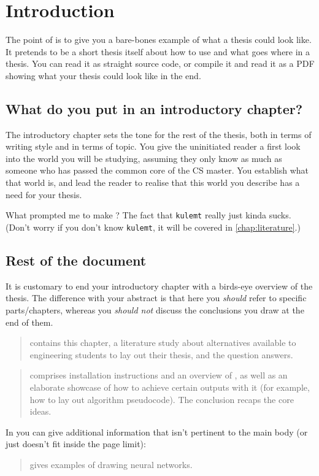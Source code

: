 \chapter{Introduction}\label{chap:intro}
The point of \repo is to give you a bare-bones example of what a thesis could look like. It pretends to be a short thesis itself about how to use \repo and what goes where in a thesis. You can read it as straight source code, or compile it and read it as a PDF showing what your thesis could look like in the end.

\section{What do you put in an introductory chapter?}
The introductory chapter sets the tone for the rest of the thesis, both in terms of writing style and in terms of topic. You give the uninitiated reader a first look into the world you will be studying, assuming they only know as much as someone who has passed the common core of the CS master. You establish what that world is, and lead the reader to realise that this world you describe has a need for your thesis.

What prompted me to make \repo? The fact that \texttt{kulemt} really just kinda sucks. (Don't worry if you don't know \texttt{kulemt}, it will be covered in \autoref{chap:literature}.)

\section{Rest of the document}
It is customary to end your introductory chapter with a birds-eye overview of the thesis. The difference with your abstract is that here you \emph{should} refer to specific parts/chapters, whereas you \emph{should not} discuss the conclusions you draw at the end of them.
\begin{quote}
	 contains this chapter, a literature study about alternatives available to engineering students to lay out their thesis, and the question \repo answers.
\end{quote}
\begin{quote}
	 comprises installation instructions and an overview of \repo, as well as an elaborate showcase of how to achieve certain outputs with it (for example, how to lay out algorithm pseudocode). The conclusion recaps the core ideas.
\end{quote}

In  you can give additional information that isn't pertinent to the main body (or just doesn't fit inside the page limit):
\begin{quote}
	 gives examples of drawing neural networks.
\end{quote}
